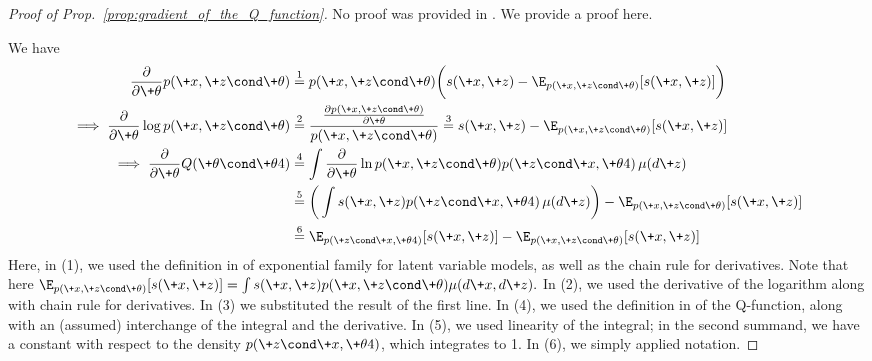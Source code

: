 \documentclass{article} %
\newcommand{\sufficientStatsFunction}{s}
\begin{document}
 
\begin{proof}[Proof of Prop.~\ref{prop:gradient_of_the_Q_function}] No proof was provided in \citet{salakhutdinov2002relationship}. We provide a proof here.

We have 
\begin{align*}
\frac{\partial}{\partial \+\theta}  p(\+x, \+z \cond \+\theta) & \stackrel{1}{=} p(\+x, \+z \cond \+\theta) \bigg( \sufficientStatsFunction(\+x, \+z) - \E
_{p(\+x,\+z \cond \+\theta)} [\sufficientStatsFunction(\+x, \+z)] \bigg) \\
\implies \frac{\partial}{\partial \+\theta}  \log p(\+x, \+z \cond \+\theta) & \stackrel{2}{=} \frac{\frac{\partial p(\+x, \+z \cond \+\theta)}{\partial \+\theta}}{p(\+x, \+z \cond \+\theta)} \stackrel{3}{=}  \sufficientStatsFunction(\+x, \+z) - \E
_{p(\+x,\+z \cond \+\theta)} [\sufficientStatsFunction(\+x, \+z)] \\
\implies \frac{\partial}{\partial \+\theta}  Q(\+\theta \cond \+\theta^^t) & \stackrel{4}{=} \int \frac{\partial}{\partial \+\theta} \ln p(
\+x ,\+z \cond \+\theta) p(\+z \cond \+x, \+\theta^^t) \, \mu(d\+z) \\
& \stackrel{5}{=} \bigg( \int \sufficientStatsFunction(\+x, \+z) p(\+z \cond \+x, \+\theta^^t) \, \mu(d\+z)\bigg) - \E
_{p(\+x,\+z \cond \+\theta)} [\sufficientStatsFunction(\+x, \+z)]  \\
& \stackrel{6}{=} \E
_{p(\+z \cond \+x, \+\theta^^t)} [\sufficientStatsFunction(\+x, \+z)]   - \E
_{p(\+x,\+z \cond \+\theta)} [\sufficientStatsFunction(\+x, \+z)] 
\end{align*}
%
Here, in (1), we used the definition in  of exponential family for latent variable models, as well as the chain rule for derivatives.   Note that here $\E
_{p(\+x,\+z \cond \+\theta)} [\sufficientStatsFunction(\+x, \+z)] =  \int \sufficientStatsFunction(\+x, \+z) p(\+x,\+z \cond \+\theta) \mu(d\+x, d\+z).$ In (2), we used the derivative of the logarithm along with chain rule for derivatives. In (3) we substituted the result of the first line. In (4), we used the definition in 
of the Q-function, along with an (assumed) interchange of the integral and the derivative. In (5), we used linearity of the integral; in the second summand, we have a constant with respect to the density $p(\+z \cond \+x, \+\theta^^t)$, which integrates to 1.  In (6), we simply applied notation.  
\end{proof}
\end{document}
